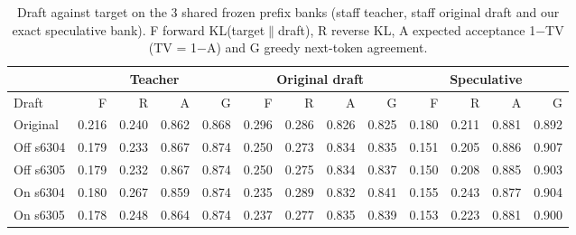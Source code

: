 \begin{table}[!htb]
\centering
\scriptsize
\setlength{\tabcolsep}{3.5pt}
\caption{Draft against target on the 3 shared frozen prefix banks (staff teacher, staff original draft and our exact speculative bank). F forward KL(target$\|$draft), R reverse KL, A expected acceptance 1$-$TV (TV = 1$-$A) and G greedy next-token agreement.}
\label{tab:t3dist}
\begin{adjustbox}{max width=\linewidth}
\begin{tabular}{lrrrrrrrrrrrr}
\toprule
 & \multicolumn{4}{c}{Teacher} & \multicolumn{4}{c}{Original draft} & \multicolumn{4}{c}{Speculative} \\
\midrule
Draft & F & R & A & G & F & R & A & G & F & R & A & G \\
\midrule
Original & 0.216 & 0.240 & 0.862 & 0.868 & 0.296 & 0.286 & 0.826 & 0.825 & 0.180 & 0.211 & 0.881 & 0.892 \\
Off s6304 & 0.179 & 0.233 & 0.867 & 0.874 & 0.250 & 0.273 & 0.834 & 0.835 & 0.151 & 0.205 & 0.886 & 0.907 \\
Off s6305 & 0.179 & 0.232 & 0.867 & 0.874 & 0.250 & 0.275 & 0.834 & 0.837 & 0.150 & 0.208 & 0.885 & 0.903 \\
On s6304 & 0.180 & 0.267 & 0.859 & 0.874 & 0.235 & 0.289 & 0.832 & 0.841 & 0.155 & 0.243 & 0.877 & 0.904 \\
On s6305 & 0.178 & 0.248 & 0.864 & 0.874 & 0.237 & 0.277 & 0.835 & 0.839 & 0.153 & 0.223 & 0.881 & 0.900 \\
\bottomrule
\end{tabular}
\end{adjustbox}
\end{table}
